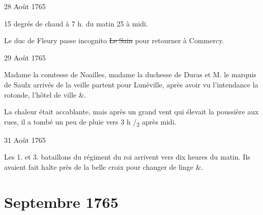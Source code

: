                      \begin{diary}{28 Août 1765}{}
                        
                        
                           15 degrés de chaud à 7 h. du matin
                           25 à midi. \bigskip
        
        
                        
                           Le duc de Fleury passe incognito
                           \sout{Le Sain} pour retourner à Commercy. \bigskip
        
        
                     \end{diary}
                     

                     \begin{diary}{29 Août 1765}{}
                        
                        
                           Madame la comtesse de Noailles, madame la duchesse de
                              Duras et M. le marquis de Saulx arrivés de la
                           veille partent pour Lunéville, après avoir
                           vu l'intendance la rotonde, l'hôtel de
                              ville &. \bigskip
        
        
                         La chaleur était accablante,
                           mais après
                           un grand vent qui élevait la poussière aux
                           rues, il a tombé un peu de pluie vers
                           3 h /\textsubscript{2}
                           après midi. \bigskip
        
        
                     \end{diary}

                     \begin{diary}{31 Août 1765}{}
                        
                         Les 1. et
                              3. bataillons du régiment
                              du roi arrivent vers dix heures du
                           matin. Ils avaient fait
                           halte près de la
                           belle croix pour changer de linge &. \bigskip
        
        
                     \end{diary}
                  \chapter*{Septembre 1765}
                     
